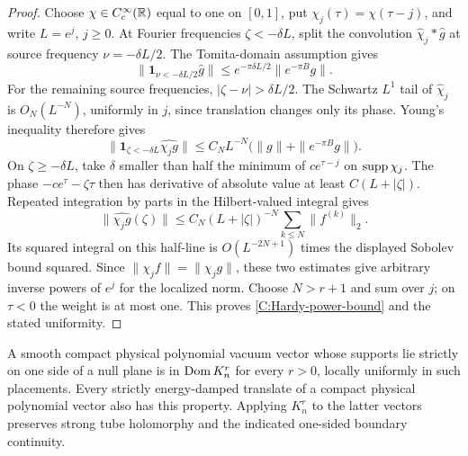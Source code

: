 \begin{proof}
Choose $\chi\in C_c^\infty(\mathbb R)$ equal to one on $[0,1]$, put
$\chi_j(\tau)=\chi(\tau-j)$, and write $L=e^j$, $j\ge0$.
At Fourier frequencies $\zeta<-\delta L$, split the convolution
$\widehat\chi_j*\widehat g$ at source frequency $\nu=-\delta L/2$.
The Tomita-domain assumption gives
\[
 \|\mathbf1_{\nu<-\delta L/2}\widehat g\|
 \le e^{-\pi\delta L/2}\|e^{-\pi B}g\|.
\]
For the remaining source frequencies, $|\zeta-\nu|>\delta L/2$.
The Schwartz $L^1$ tail of $\widehat\chi_j$ is $O_N(L^{-N})$,
uniformly in $j$, since translation changes only its phase. Young's
inequality therefore gives
\[
 \|\mathbf1_{\zeta<-\delta L}\widehat{\chi_jg}\|
 \le C_NL^{-N}\bigl(\|g\|+\|e^{-\pi B}g\|\bigr).
\]
On $\zeta\ge-\delta L$, take $\delta$ smaller than half the minimum
of $ce^{\tau-j}$ on $\operatorname{supp}\chi_j$. The phase
$-ce^\tau-\zeta\tau$ then has derivative of absolute value at least
$C(L+|\zeta|)$. Repeated integration by parts in the Hilbert-valued
integral gives
\[
 \|\widehat{\chi_jg}(\zeta)\|
 \le C_N(L+|\zeta|)^{-N}\sum_{k\le N}\|f^{(k)}\|_2.
\]
Its squared integral on this half-line is $O(L^{-2N+1})$ times the
displayed Sobolev bound squared. Since $\|\chi_jf\|=\|\chi_jg\|$,
these two estimates give arbitrary inverse powers of $e^j$ for the
localized norm. Choose $N>r+1$ and sum over $j$; on $\tau<0$ the
weight is at most one. This proves \eqref{C:Hardy-power-bound} and
the stated uniformity.
\end{proof}

\begin{lemma}\label{C:K-domains}
A smooth compact physical polynomial vacuum vector whose supports
lie strictly on one side of a null plane is in $\operatorname{Dom} K_n^r$ for
every $r>0$, locally uniformly in such placements. Every strictly
energy-damped translate of a compact physical polynomial vector
also has this property. Applying $K_n^r$ to the latter vectors
preserves strong tube holomorphy and the indicated one-sided
boundary continuity.
\end{lemma}

